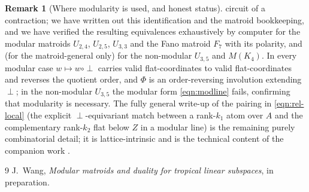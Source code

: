 \documentclass{article}
\theoremstyle{definition}
\newtheorem{remark}[theorem]{Remark}
\begin{document}
\begin{remark}[Where modularity is used, and honest status]
circuit of a contraction; we have written out this identification and the matroid bookkeeping, and we
have verified the resulting equivalences exhaustively by computer for the modular matroids $U_{2,4}$,
$U_{2,5}$, $U_{3,3}$ and the Fano matroid $F_7$ with its polarity, and (for the matroid-general
 only) for the non-modular $U_{3,5}$ and $M(K_4)$. In every modular case
$w\mapsto w\circ\perp$ carries valid flat-coordinates to valid flat-coordinates and reverses the
quotient order, and $\Phi$ is an order-reversing involution extending $\perp$; in the non-modular
$U_{3,5}$ the modular form \eqref{eqn:modline} fails, confirming that modularity is necessary. The
fully general write-up of the pairing in \eqref{eqn:rel-local} (the explicit $\perp$-equivariant match
between a rank-$k_1$ atom over $A$ and the complementary rank-$k_2$ flat below $Z$ in a modular line)
is the remaining purely combinatorial detail; it is lattice-intrinsic and is the technical content of
the companion work \cite{wang26modular}.
\end{remark}

\begin{thebibliography}{9}
 J.~Wang, \emph{Modular matroids and duality for tropical linear subspaces},
in preparation.
\end{thebibliography}
\end{document}
